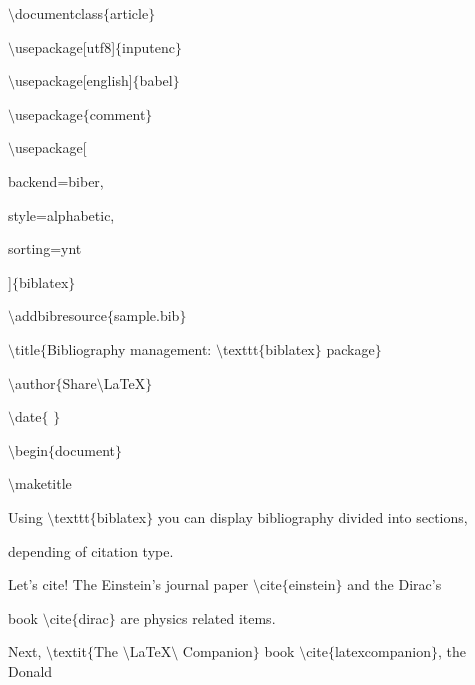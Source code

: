 \begin{itemize}
 $\setminus$documentclass$ \{ $article$ \} $\par

$\setminus$usepackage[utf8]$ \{ $inputenc$ \} $\par

$\setminus$usepackage[english]$ \{ $babel$ \} $\par

$\setminus$usepackage$ \{ $comment$ \} $\par

$\setminus$usepackage[\par

backend=biber,\par

style=alphabetic,\par

sorting=ynt\par

]$ \{ $biblatex$ \} $\par

$\setminus$addbibresource$ \{ $sample.bib$ \} $\par

$\setminus$title$ \{ $Bibliography management: $\setminus$texttt$ \{ $biblatex$ \} $ package$ \} $\par

$\setminus$author$ \{ $Share$\setminus$LaTeX$ \} $\par

$\setminus$date$ \{ $ $ \} $\par

$\setminus$begin$ \{ $document$ \} $\par

$\setminus$maketitle\par

Using $\setminus$texttt$ \{ $biblatex$ \} $ you can display bibliography divided into sections, \par

depending of citation type. \par

Let's cite! The Einstein's journal paper $\setminus$cite$ \{ $einstein$ \} $ and the Dirac's \par

book $\setminus$cite$ \{ $dirac$ \} $ are physics related items. \par

Next, $\setminus$textit$ \{ $The $\setminus$LaTeX$\setminus$ Companion$ \} $ book $\setminus$cite$ \{ $latexcompanion$ \} $, the Donald \par


\end{itemize}
